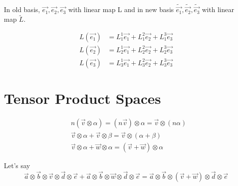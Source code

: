 \documentclass{article}
\begin{document}
	In old basis, $\overrightarrow{e_{1}},\overrightarrow{e_{2}},\overrightarrow{e_{3}}$ with linear map L and in new basis $\widetilde{\overrightarrow{e_{1}}},\widetilde{\overrightarrow{e_{2}}},\widetilde{\overrightarrow{e_{3}}}$ with linear map $\widetilde{L}$.
	
	\begin{center}
		\begin{align*}
			L(\overrightarrow{e_{1}}) &= L^{1}_{1}\overrightarrow{e_{1}} + L^{2}_{1}\overrightarrow{e_{2}} + L^{3}_{1}\overrightarrow{e_{3}}\\
			L(\overrightarrow{e_{2}}) &= L^{1}_{2}\overrightarrow{e_{1}} + L^{2}_{2}\overrightarrow{e_{2}} + L^{3}_{2}\overrightarrow{e_{3}}\\
			L(\overrightarrow{e_{3}}) &= L^{1}_{3}\overrightarrow{e_{1}} + L^{2}_{3}\overrightarrow{e_{2}} + L^{3}_{3}\overrightarrow{e_{3}}
		\end{align*}
	\end{center}

	\section*{Tensor Product Spaces}
	\begin{tcolorbox}
		\begin{align*}
			& n(\overrightarrow{v}\otimes\alpha) = (n\overrightarrow{v})\otimes\alpha = \overrightarrow{v}\otimes(n\alpha)\\
			& \overrightarrow{v}\otimes\alpha + \overrightarrow{v}\otimes\beta = \overrightarrow{v}\otimes(\alpha + \beta)\\
			& \overrightarrow{v}\otimes\alpha + \overrightarrow{w}\otimes\alpha = (\overrightarrow{v}+\overrightarrow{w})\otimes\alpha
		\end{align*}
	\end{tcolorbox}
	
	Let's say 
	$$\overrightarrow{a}\otimes\overrightarrow{b}\otimes\overrightarrow{v}\otimes\overrightarrow{d}\otimes\overrightarrow{e} + \overrightarrow{a}\otimes\overrightarrow{b}\otimes\overrightarrow{w}\otimes\overrightarrow{d}\otimes\overrightarrow{e} = \overrightarrow{a}\otimes\overrightarrow{b}\otimes(\overrightarrow{v} + \overrightarrow{w})\otimes\overrightarrow{d}\otimes\overrightarrow{e}$$
	
\end{document}
